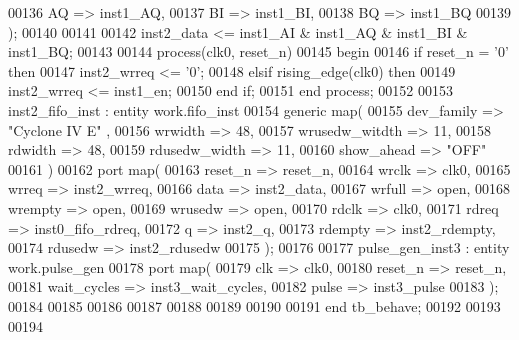 \begin{DoxyCode}
00136       AQ          => inst1_AQ,
00137       BI          => inst1_BI,
00138       BQ          => inst1_BQ      
00139         \textcolor{vhdlchar}{)};
00140         
00141         
00142 inst2\_data <= inst1\_AI & inst1\_AQ & inst1\_BI & inst1\_BQ;
00143 
00144 \textcolor{keywordflow}{process}(clk0, reset_n)
00145 \textcolor{vhdlkeyword}{begin }
00146    \textcolor{keywordflow}{if} \textcolor{vhdlchar}{reset_n} \textcolor{vhdlchar}{=} \textcolor{vhdlchar}{'}\textcolor{vhdllogic}{}\textcolor{vhdllogic}{0}\textcolor{vhdlchar}{'} \textcolor{keywordflow}{then} 
00147       inst2\_wrreq <= '0';
00148    \textcolor{keywordflow}{elsif} \textcolor{vhdlchar}{rising\_edge}\textcolor{vhdlchar}{(}\textcolor{vhdlchar}{clk0}\textcolor{vhdlchar}{)} \textcolor{keywordflow}{then} 
00149       inst2\_wrreq <= inst1\_en;
00150    \textcolor{keywordflow}{end} \textcolor{keywordflow}{if};
00151 \textcolor{keywordflow}{end} \textcolor{keywordflow}{process};
00152     
00153 inst2\_fifo\_inst : \textcolor{keywordflow}{entity} work.fifo_inst
00154    \textcolor{keywordflow}{generic} \textcolor{keywordflow}{map}(
00155       dev_family      => \textcolor{keyword}{"Cyclone IV E"}  ,
00156       wrwidth         => \textcolor{vhdllogic}{48},
00157       wrusedw_witdth  => \textcolor{vhdllogic}{11}, 
00158       rdwidth         => \textcolor{vhdllogic}{48},
00159       rdusedw_width   => \textcolor{vhdllogic}{11},
00160       show_ahead      => \textcolor{keyword}{"OFF"}
00161   \textcolor{vhdlchar}{)}
00162   \textcolor{keywordflow}{port} \textcolor{keywordflow}{map}(
00163       reset_n       => reset_n,
00164       wrclk         => clk0,
00165       wrreq         => inst2_wrreq,
00166       data          => inst2_data,
00167       wrfull        => \textcolor{keywordflow}{open},
00168       wrempty       => \textcolor{keywordflow}{open},
00169       wrusedw       => \textcolor{keywordflow}{open},
00170       rdclk         => clk0,
00171       rdreq         => inst0_fifo_rdreq,
00172       q             => inst2_q,
00173       rdempty       => inst2_rdempty,
00174       rdusedw       => inst2_rdusedw 
00175 \textcolor{vhdlchar}{)}; 
00176 
00177 pulse\_gen\_inst3 : \textcolor{keywordflow}{entity} work.pulse_gen
00178    \textcolor{keywordflow}{port} \textcolor{keywordflow}{map}(
00179       clk         => clk0,
00180       reset_n     => reset_n,
00181       wait_cycles => inst3_wait_cycles,
00182       pulse       => inst3_pulse
00183    \textcolor{vhdlchar}{)};
00184    
00185 
00186 
00187 
00188 
00189 
00190 
00191 \textcolor{keywordflow}{end} \textcolor{vhdlchar}{tb\_behave};
00192    
00193 
00194   
\end{DoxyCode}
